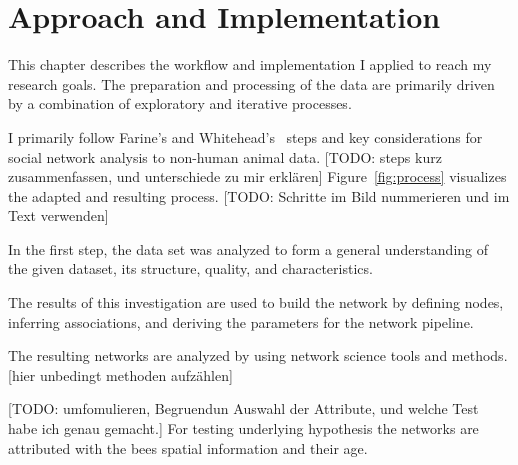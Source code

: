 \chapter{Approach and Implementation}
\label{ch:approach}


This chapter describes the workflow and implementation I applied to reach my research goals.
The preparation and processing of the data are primarily driven by a combination of exploratory and iterative processes.

I primarily follow  Farine's and Whitehead's~\cite{farine2015constructing} steps and key considerations for social network analysis to non-human animal data.
[TODO: steps kurz zusammenfassen, und unterschiede zu mir erklären]
Figure~\ref{fig:process} visualizes the adapted and resulting process.
[TODO: Schritte im Bild nummerieren und im Text verwenden]

In the first step, the data set was analyzed to form a general understanding of the given dataset, its structure, quality, and characteristics.

The results of this investigation are used to build the network by defining nodes, inferring associations, and deriving the parameters for the network pipeline.

The resulting networks are analyzed by using network science tools and methods.
[hier unbedingt methoden aufzählen]																																																																																																						

[TODO: umfomulieren, Begruendun Auswahl der Attribute, und welche Test habe ich genau gemacht.]
For testing underlying hypothesis the networks are attributed with the bees spatial information and their age.

